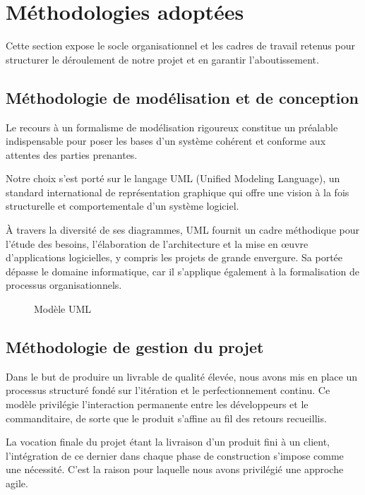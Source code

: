 \section{Méthodologies adoptées}
Cette section expose le socle organisationnel et les cadres de travail retenus pour structurer le déroulement de notre projet et en garantir l'aboutissement.

\subsection{Méthodologie de modélisation et de conception}
Le recours à un formalisme de modélisation rigoureux constitue un préalable indispensable pour poser les bases d'un système cohérent et conforme aux attentes des parties prenantes.

Notre choix s'est porté sur le langage UML (Unified Modeling Language), un standard international de représentation graphique qui offre une vision à la fois structurelle et comportementale d'un système logiciel.

À travers la diversité de ses diagrammes, UML fournit un cadre méthodique pour l'étude des besoins, l'élaboration de l'architecture et la mise en œuvre d'applications logicielles, y compris les projets de grande envergure. Sa portée dépasse le domaine informatique, car il s'applique également à la formalisation de processus organisationnels.

\begin{figure}[H]
    \centering
    \caption{Modèle UML}
    \label{fig:modele_uml}
\end{figure}

\subsection{Méthodologie de gestion du projet}
Dans le but de produire un livrable de qualité élevée, nous avons mis en place un processus structuré fondé sur l'itération et le perfectionnement continu. Ce modèle privilégie l'interaction permanente entre les développeurs et le commanditaire, de sorte que le produit s'affine au fil des retours recueillis.

La vocation finale du projet étant la livraison d'un produit fini à un client, l'intégration de ce dernier dans chaque phase de construction s'impose comme une nécessité. C'est la raison pour laquelle nous avons privilégié une approche agile.

